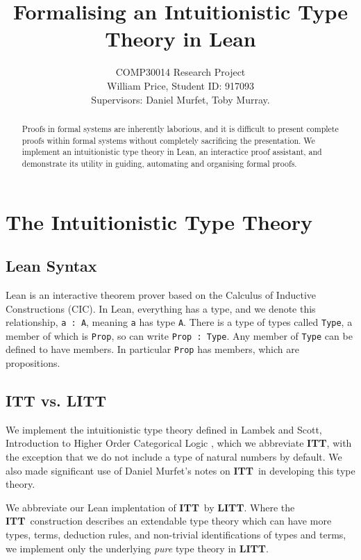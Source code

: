 \documentclass[12pt,leqno]{article}
\title{Formalising an Intuitionistic Type Theory in Lean}
\author{COMP30014 Research Project \\William Price, Student ID: 917093\\ Supervisors: Daniel Murfet, Toby Murray.}
\def\lc{\lstinline}
\newcommand{\ITT}{\textbf{ITT}}
\newcommand{\LITT}{\textbf{LITT}}
\theoremstyle{example}
\numberwithin{equation}{section}
\begin{document}
\maketitle

\begin{abstract}
  Proofs in formal systems are inherently laborious, and it is difficult to present complete proofs within formal systems without completely sacrificing the presentation. We implement an intuitionistic type theory in Lean, an interactice proof assistant, and demonstrate its utility in guiding, automating and organising formal proofs.
\end{abstract}

\tableofcontents


\section{The Intuitionistic Type Theory}

\subsection{Lean Syntax}

Lean is an interactive theorem prover \cite{lean} based on the Calculus of Inductive Constructions\cite{carneiro} (CIC). In Lean, everything has a type, and we denote this relationship, \lc{a : A}, meaning \lc{a} has type \lc{A}. There is a type of types called \lc{Type}, a member of which is \lc{Prop}, so can write \lc{Prop : Type}. Any member of \lc{Type} can be defined to have members. In particular \lc{Prop} has members, which are propositions. 


\subsection{ITT vs. LITT}

We implement the intuitionistic type theory defined in Lambek and Scott, Introduction to Higher Order Categorical Logic \cite{lambek_scott}, which we abbreviate \ITT, with the exception that we do not include a type of natural numbers by default. We also made significant use of Daniel Murfet's notes on \ITT~in developing this type theory.

We abbreviate our Lean implentation of \ITT~by \LITT. Where the \ITT~construction describes an extendable type theory which can have more types, terms, deduction rules, and non-trivial identifications of types and terms, we implement only the underlying \emph{pure} type theory in \LITT.
\end{document}
